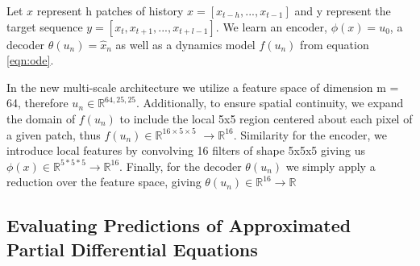 \documentclass[12pt]{article}
\newcommand{\R}{ \ensuremath{\mathbb{R}}}  %
\theoremstyle{plain}
\theoremstyle{remark}
\theoremstyle{definition}
\begin{document}
Let $x$ represent h patches of history $x = [x_{t-h}, ..., x_{t-1}]$ and y represent the target sequence $y = 
[x_{t}, x_{t+1},...,x_{t+l-1}]$.  We learn an encoder, $\phi(x) = u_0$, a decoder $\theta(u_n) = \hat{x}_n$ as well as a dynamics model $f(u_n)$ from equation \ref{eqn:ode}.  

In the new multi-scale architecture we utilize a feature space of dimension m = 64, therefore $u_n \in \R^{64, 25, 25}$. Additionally, to ensure spatial continuity, we expand the domain of  $f(u_n)$ to include the local 5x5 region centered about each pixel of a given patch, thus $f(u_n) \in \R^{16 \times 5 \times 5}$ $\rightarrow \R^{16}$. 
Similarity for the encoder, we introduce local features by convolving 16 filters of shape 5x5x5 giving us $\phi(x) \in \R^{5*5*5} \rightarrow \R^{16}$. Finally, for the decoder $\theta(u_n)$ we simply apply a reduction over the feature space, giving  $\theta(u_n) \in \R^{16} \rightarrow \R$




\subsection{Evaluating Predictions of Approximated Partial Differential Equations}
\end{document}
